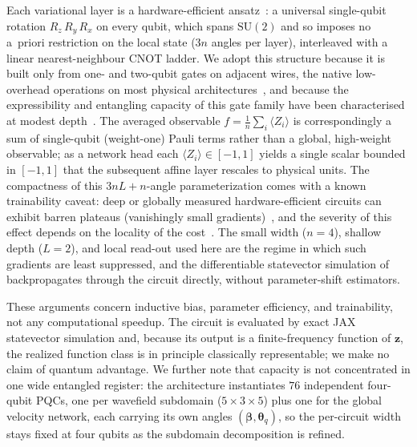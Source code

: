 Each variational layer is a hardware-efficient ansatz~\cite{cerezo2021variational,kandala2017hardware}: a universal single-qubit rotation $R_z\,R_y\,R_x$ on every qubit, which spans $\mathrm{SU}(2)$ and so imposes no a~priori restriction on the local state ($3n$ angles per layer), interleaved with a linear nearest-neighbour CNOT ladder. We adopt this structure because it is built only from one- and two-qubit gates on adjacent wires, the native low-overhead operations on most physical architectures~\cite{Preskill2018quantumcomputingin,kandala2017hardware}, and because the expressibility and entangling capacity of this gate family have been characterised at modest depth~\cite{sim2019expressibility,Benedetti_2019}. The averaged observable $f=\tfrac{1}{n}\sum_i\langle Z_i\rangle$ is correspondingly a sum of single-qubit (weight-one) Pauli terms rather than a global, high-weight observable; as a network head each $\langle Z_i\rangle\in[-1,1]$ yields a single scalar bounded in $[-1,1]$ that the subsequent affine layer rescales to physical units. The compactness of this $3nL+n$-angle parameterization comes with a known trainability caveat: deep or globally measured hardware-efficient circuits can exhibit barren plateaus (vanishingly small gradients)~\cite{mcclean2018barren}, and the severity of this effect depends on the locality of the cost~\cite{cerezo2021costfunction}. The small width ($n=4$), shallow depth ($L=2$), and local read-out used here are the regime in which such gradients are least suppressed, and the differentiable statevector simulation of backpropagates through the circuit directly, without parameter-shift estimators.

These arguments concern inductive bias, parameter efficiency, and trainability, not any computational speedup. The circuit is evaluated by exact JAX statevector simulation and, because its output is a finite-frequency function of $\mathbf{z}$, the realized function class is in principle classically representable; we make no claim of quantum advantage. We further note that capacity is not concentrated in one wide entangled register: the architecture instantiates $76$ independent four-qubit PQCs, one per wavefield subdomain ($5\!\times\!3\!\times\!5$) plus one for the global velocity network, each carrying its own angles $(\boldsymbol{\beta},\boldsymbol{\theta}_q)$, so the per-circuit width stays fixed at four qubits as the subdomain decomposition is refined.

